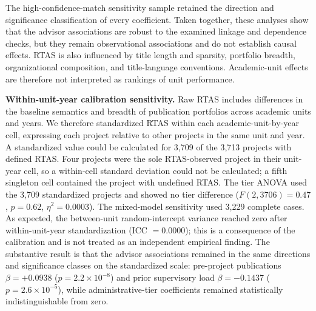 \documentclass[pdflatex,sn-apa]{sn-jnl}
\begin{document}
The high-confidence-match sensitivity sample retained the direction and significance classification of every coefficient. Taken together, these analyses show that the advisor associations are robust to the examined linkage and dependence checks, but they remain observational associations and do not establish causal effects. RTAS is also influenced by title length and sparsity, portfolio breadth, organizational composition, and title-language conventions. Academic-unit effects are therefore not interpreted as rankings of unit performance.

\textbf{Within-unit-year calibration sensitivity.} Raw RTAS includes differences in the baseline semantics and breadth of publication portfolios across academic units and years. We therefore standardized RTAS within each academic-unit-by-year cell, expressing each project relative to other projects in the same unit and year. A standardized value could be calculated for 3,709 of the 3,713 projects with defined RTAS. Four projects were the sole RTAS-observed project in their unit-year cell, so a within-cell standard deviation could not be calculated; a fifth singleton cell contained the project with undefined RTAS. The tier ANOVA used the 3,709 standardized projects and showed no tier difference ($F(2,3706)=0.47$, $p=0.62$, $\eta^2=0.0003$). The mixed-model sensitivity used 3,229 complete cases. As expected, the between-unit random-intercept variance reached zero after within-unit-year standardization (ICC $=0.0000$); this is a consequence of the calibration and is not treated as an independent empirical finding. The substantive result is that the advisor associations remained in the same directions and significance classes on the standardized scale: pre-project publications $\beta=+0.0938$ ($p=2.2\times10^{-8}$) and prior supervisory load $\beta=-0.1437$ ($p=2.6\times10^{-5}$), while administrative-tier coefficients remained statistically indistinguishable from zero.
\end{document}
